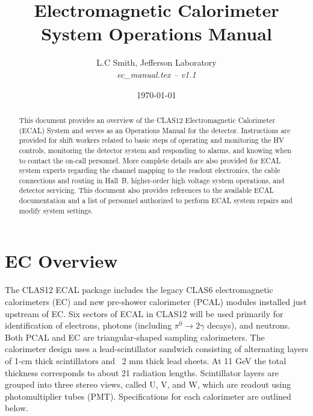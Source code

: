 \documentclass[letterpaper,10pt]{article}
\begin{document}
\title{Electromagnetic Calorimeter System Operations Manual}

\vskip 0.5cm

\author{L.C Smith, Jefferson Laboratory\\[0.2ex]
{\it ec\_manual.tex -- v1.1}}

\date \today
%
\maketitle

\begin{abstract}
This document provides an overview of the CLAS12 Electromagnetic Calorimeter (ECAL) System and serves 
as an Operations Manual for the detector. Instructions are provided for shift workers related to 
basic steps of operating and monitoring the HV controls, monitoring the detector system and 
responding to alarms, and knowing when to contact the on-call personnel. More complete details 
are also provided for ECAL system experts regarding the channel mapping to the readout electronics, 
the cable connections and routing in Hall~B, higher-order high voltage system operations, and 
detector servicing. This document also provides references to the available ECAL documentation and 
a list of personnel authorized to perform ECAL system repairs and modify system settings.
\end{abstract}

\thispagestyle{empty}

\clearpage

\vfil
\eject

\tableofcontents

\vfil
\eject

\section{EC Overview}
\label{intro}

The CLAS12 ECAL package includes the legacy CLAS6 electromagnetic calorimeters (EC) and new pre-shower calorimeter (PCAL) modules installed just upstream of EC.  Six sectors of ECAL in CLAS12 will be used primarily for identification of electrons, photons (including $\pi^0\rightarrow 2\gamma$ decays), and neutrons.
Both PCAL and EC are triangular-shaped sampling calorimeters. The calorimeter design uses a lead-scintillator sandwich consisting of alternating layers of 1-cm thick scintillators and ~2 mm thick lead sheets. At 11 GeV the total thickness corresponds to about 21 radiation lengths. Scintillator layers are grouped into three stereo views, called U, V, and W,  which are readout using photomultiplier tubes (PMT).  Specifications for each calorimeter are outlined below. 
\end{document}
